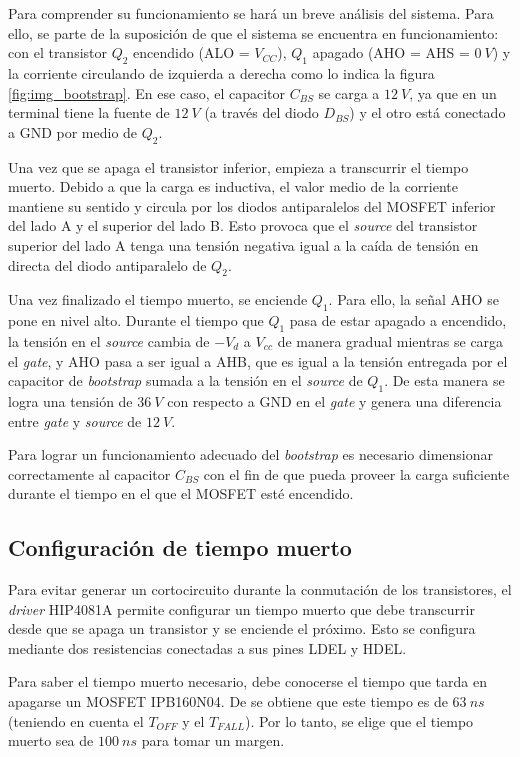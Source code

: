 Para comprender su funcionamiento se hará un breve análisis del sistema. Para ello, se parte de la suposición de que el sistema se encuentra en funcionamiento: con el transistor $Q_2$ encendido (ALO = $V_{CC}$), $Q_1$ apagado (AHO = AHS = $0\:V$) y la corriente circulando de izquierda a derecha como lo indica la figura \ref{fig:img_bootstrap}. En ese caso, el capacitor $C_{BS}$ se carga a $12\:V$, ya que en un terminal tiene la fuente de $12\:V$ (a través del diodo $D_{BS}$) y el otro está conectado a GND por medio de $Q_2$.

Una vez que se apaga el transistor inferior, empieza a transcurrir el tiempo muerto. Debido a que la carga es inductiva, el valor medio de la corriente mantiene su sentido y circula por los diodos antiparalelos del MOSFET inferior del lado A y el superior del lado B. Esto provoca que el \textsl{source} del transistor superior del lado A tenga una tensión negativa igual a la caída de tensión en directa del diodo antiparalelo de $Q_2$. 

Una vez finalizado el tiempo muerto, se enciende $Q_1$. Para ello, la señal AHO se pone en nivel alto. Durante el tiempo que $Q_1$ pasa de estar apagado a encendido, la tensión en el \textsl{source} cambia de $-V_d$ a $V_{cc}$ de manera gradual mientras se carga el \textsl{gate}, y AHO pasa a ser igual a AHB, que es igual a la tensión entregada por el capacitor de \textsl{bootstrap} sumada a la tensión en el \textsl{source} de $Q_1$. De esta manera se logra una tensión de $36\:V$ con respecto a GND en el \textsl{gate} y genera una diferencia entre \textsl{gate} y \textsl{source} de $12\:V$.

Para lograr un funcionamiento adecuado del \textsl{bootstrap} es necesario dimensionar correctamente al capacitor $C_{BS}$ con el fin de que pueda proveer la carga suficiente durante el tiempo en el que el MOSFET esté encendido.

\subsection{Configuración de tiempo muerto}

\noindent Para evitar generar un cortocircuito durante la conmutación de los transistores, el \textsl{driver} HIP4081A permite configurar un tiempo muerto que debe transcurrir desde que se apaga un transistor y se enciende el próximo. Esto se configura mediante dos resistencias conectadas a sus pines LDEL y HDEL.

\noindent Para saber el tiempo muerto necesario, debe conocerse el tiempo que tarda en apagarse un MOSFET IPB160N04. De \cite{IPB160N04} se obtiene que este tiempo es de $63\:ns$ (teniendo en cuenta el $T_{OFF}$ y el $T_{FALL}$). Por lo tanto, se elige que el tiempo muerto sea de $100\:ns$ para tomar un margen.

